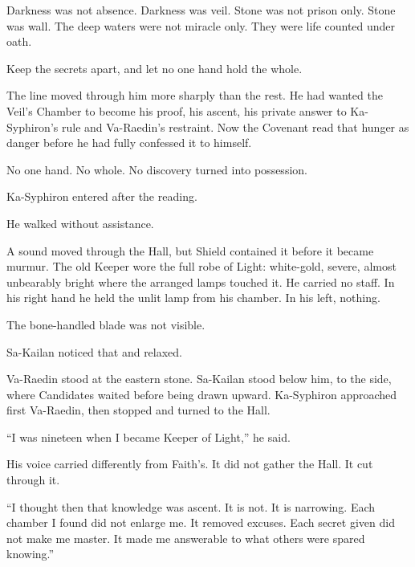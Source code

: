 Darkness was not absence. Darkness was veil. Stone was not prison only. Stone was wall. The deep waters were not miracle only. They were life counted under oath.\par

Keep the secrets apart, and let no one hand hold the whole.\par

The line moved through him more sharply than the rest. He had wanted the Veil’s Chamber to become his proof, his ascent, his private answer to Ka-Syphiron’s rule and Va-Raedin’s restraint. Now the Covenant read that hunger as danger before he had fully confessed it to himself.\par

No one hand. No whole. No discovery turned into possession.\par

Ka-Syphiron entered after the reading.\par

He walked without assistance.\par

A sound moved through the Hall, but Shield contained it before it became murmur. The old Keeper wore the full robe of Light: white-gold, severe, almost unbearably bright where the arranged lamps touched it. He carried no staff. In his right hand he held the unlit lamp from his chamber. In his left, nothing.\par

The bone-handled blade was not visible.\par

Sa-Kailan noticed that and relaxed.\par

Va-Raedin stood at the eastern stone. Sa-Kailan stood below him, to the side, where Candidates waited before being drawn upward. Ka-Syphiron approached first Va-Raedin, then stopped and turned to the Hall.\par

“I was nineteen when I became Keeper of Light,” he said.\par

His voice carried differently from Faith’s. It did not gather the Hall. It cut through it.\par

“I thought then that knowledge was ascent. It is not. It is narrowing. Each chamber I found did not enlarge me. It removed excuses. Each secret given did not make me master. It made me answerable to what others were spared knowing.”\par

